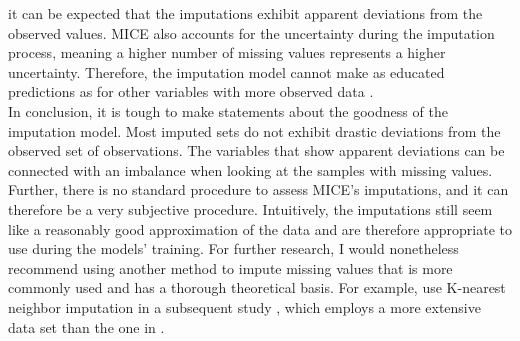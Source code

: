 it can be expected that the imputations exhibit apparent deviations from the 
observed values. MICE also accounts for the uncertainty during the imputation 
process, meaning a higher number of missing values represents a higher 
uncertainty. Therefore, the imputation model cannot make as educated 
predictions as for other variables with more observed data \cite{RN141, RN142}.
\\
In conclusion, it is tough to make statements about the goodness of the 
imputation model. Most imputed sets do not exhibit drastic deviations from the 
observed set of observations. The variables that show apparent 
deviations can be connected with an imbalance when looking at the samples with 
missing values. Further, there is no standard procedure to assess MICE's 
imputations, and it can therefore be a very subjective procedure. Intuitively, 
the imputations still seem like a reasonably good approximation of the data and 
are therefore appropriate to use during the models' training.
For further research, I would nonetheless recommend using another method to 
impute missing values that is more commonly used and has a thorough theoretical 
basis. 
For example, \citeauthor{RN127} use K-nearest neighbor imputation in a 
subsequent study \cite{RN179}, which employs a more extensive data set than the 
one in \cite{RN127}.
